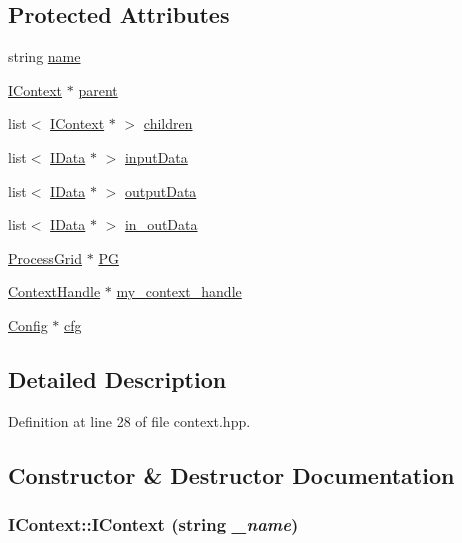 \subsection*{Protected Attributes}
\begin{DoxyCompactItemize}
\item 
string \hyperlink{class_i_context_ae92fa26bc80aa6759c7410c2f933c68b}{name}
\item 
\hyperlink{class_i_context}{IContext} $\ast$ \hyperlink{class_i_context_aa97a20f038e5c3053c94f1a70779a0f1}{parent}
\item 
list$<$ \hyperlink{class_i_context}{IContext} $\ast$ $>$ \hyperlink{class_i_context_a4b81890185d165540acdeb1e012264be}{children}
\item 
list$<$ \hyperlink{class_i_data}{IData} $\ast$ $>$ \hyperlink{class_i_context_a7284704610c7ea7cca699c8116feee0c}{inputData}
\item 
list$<$ \hyperlink{class_i_data}{IData} $\ast$ $>$ \hyperlink{class_i_context_a7a37d0f4ea08c03624d14ae2860f077f}{outputData}
\item 
list$<$ \hyperlink{class_i_data}{IData} $\ast$ $>$ \hyperlink{class_i_context_a398973dc27b31e89a4b4ab0f701dfee5}{in\_\-outData}
\item 
\hyperlink{class_process_grid}{ProcessGrid} $\ast$ \hyperlink{class_i_context_a1155fe76cd858044298e22b7b83ab326}{PG}
\item 
\hyperlink{glb__context_8hpp_a5d74defbecaf11c4dbb0a4ce308e1c34}{ContextHandle} $\ast$ \hyperlink{class_i_context_a9eb34b3b3544c4186cce3296d444a9ac}{my\_\-context\_\-handle}
\item 
\hyperlink{class_config}{Config} $\ast$ \hyperlink{class_i_context_a8dcedbb370532b4cfd613fd1dae366c1}{cfg}
\end{DoxyCompactItemize}


\subsection{Detailed Description}


Definition at line 28 of file context.hpp.

\subsection{Constructor \& Destructor Documentation}
\hypertarget{class_i_context_a46c1edfdc2c9ff7eb8f274f10d98949f}{
\subsubsection[{IContext}]{\setlength{\rightskip}{0pt plus 5cm}IContext::IContext (string {\em \_\-name})}}
\label{class_i_context_a46c1edfdc2c9ff7eb8f274f10d98949f}


